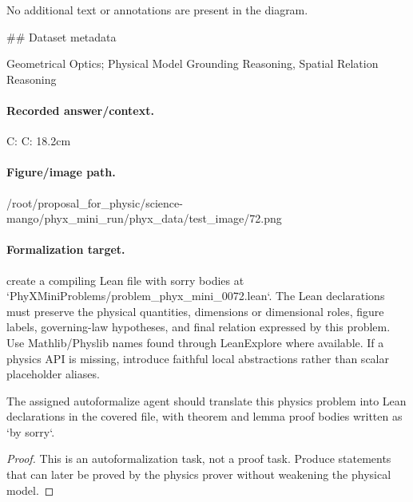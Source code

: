 No additional text or annotations are present in the diagram.

\#\# Dataset metadata

Geometrical Optics; Physical Model Grounding Reasoning, Spatial Relation Reasoning

\paragraph{Recorded answer/context.}
C: C: 18.2cm

\paragraph{Figure/image path.}
/root/proposal\_for\_physic/science-mango/phyx\_mini\_run/phyx\_data/test\_image/72.png

\paragraph{Formalization target.}
create a compiling Lean file with sorry bodies at `PhyXMiniProblems/problem\_phyx\_mini\_0072.lean`. The Lean declarations must preserve the physical quantities, dimensions or dimensional roles, figure labels, governing-law hypotheses, and final relation expressed by this problem.
Use Mathlib/Physlib names found through LeanExplore where available. If a physics API is missing, introduce faithful local abstractions rather than scalar placeholder aliases.

\begin{theorem}
\label{thm:physics:phyx_mini_0072:target}
The assigned autoformalize agent should translate this physics problem into Lean declarations in the covered file, with theorem and lemma proof bodies written as `by sorry`.
\end{theorem}
\begin{proof}
This is an autoformalization task, not a proof task. Produce statements that can later be proved by the physics prover without weakening the physical model.
\end{proof}

